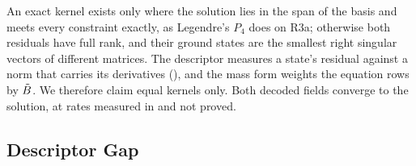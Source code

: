An exact kernel exists only where the solution lies in the span of the basis and meets every constraint exactly, as Legendre's $P_4$ does on R3a; otherwise both residuals have full rank, and their ground states are the smallest right singular vectors of different matrices. The descriptor measures a state's residual against a norm that carries its derivatives (), and the mass form weights the equation rows by $\tilde{B}$. We therefore claim equal kernels only. Both decoded fields converge to the solution, at rates measured in  and not proved.

\subsection{Descriptor Gap}
\label{sec:descriptor-gap}

